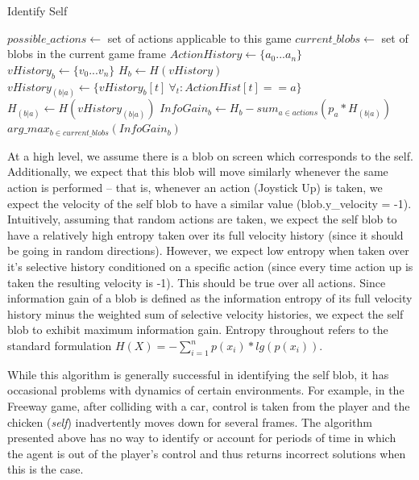 \documentclass{acm_proc_article-sp}
\begin{document}
\begin{algorithm}
\caption{Identify Self}
\label{alg:idself}
\begin{algorithmic}
  \STATE $possible\_actions \leftarrow $ set of actions applicable to this game
  \STATE $current\_blobs \leftarrow $ set of blobs in the current game frame
  \STATE $ActionHistory \leftarrow \{a_0...a_n\}$ 
  \STATE $vHistory_b \leftarrow \{v_0...v_n\}$ 
  \STATE $H_b \leftarrow H(vHistory)$ 
  \STATE $vHistory_{(b|a)} \leftarrow \{vHistory_b[t] ~\forall_t: ActionHist[t] == a\}$ 
  \STATE $H_{(b|a)} \leftarrow H(vHistory_{(b|a)})$ 
  \ENDFOR
  \STATE $InfoGain_b \leftarrow H_b - sum_{a \in actions}(p_a * H_{(b|a)})$  
  \ENDFOR
  \RETURN $arg\_max_{b \in current\_blobs}(InfoGain_b)$ 
\end{algorithmic}
\end{algorithm}

At a high level, we assume there is a blob on screen which corresponds to the self. Additionally, we expect that this blob will move similarly whenever the same action is performed -- that is, whenever an action (Joystick Up) is taken, we expect the velocity of the self blob to have a similar value (blob.y\_velocity = -1). Intuitively, assuming that random actions are taken, we expect the self blob to have a relatively high entropy taken over its full velocity history (since it should be going in random directions). However, we expect low entropy when taken over it's selective history conditioned on a specific action (since every time action up is taken the resulting velocity is -1). This should be true over all actions. Since information gain of a blob is defined as the information entropy of its full velocity history minus the weighted sum of selective velocity histories, we expect the self blob to exhibit maximum information gain. Entropy throughout refers to the standard formulation $H(X) = -\sum_{i=1}^n{p(x_i)*lg(p(x_i))}$.

While this algorithm is generally successful in identifying the self blob, it has occasional problems with dynamics of certain environments. For example, in the Freeway game, after colliding with a car, control is taken from the player and the chicken (\textit{self}) inadvertently moves down for several frames. The algorithm presented above has no way to identify or account for periods of time in which the agent is out of the player's control and thus returns incorrect solutions when this is the case. 
\end{document}
